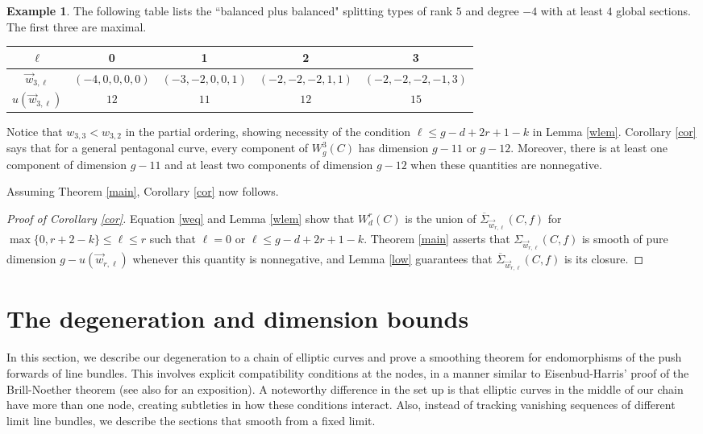 \documentclass[12pt]{amsart}
\newcommand{\Sigmabar}{\overline{\Sigma}}
\theoremstyle{definition}
\newtheorem{Example}[theorem]{Example}
\theoremstyle{remark}
\theoremstyle{remark}
\numberwithin{equation}{section}
\begin{document}
\begin{Example}
The following table lists the ``balanced plus balanced" splitting types of rank $5$ and degree $-4$ with at least $4$ global sections. The first three are maximal.
\begin{center}
\begingroup
\setlength{\tabcolsep}{8pt} %
\renewcommand{\arraystretch}{1.5}
\begin{tabular}{c||c|c|c|c}
$\ell$ & 0 & 1 & 2 & 3 \\ [2pt]
\hline
\hline
$\vec{w}_{3,\ell}$ & $(-4, 0, 0, 0, 0)$ & $(-3, -2, 0, 0, 1)$ & $(-2, -2, -2, 1, 1)$ & $(-2, -2, -2, -1, 3)$ \\ [2pt]
\hline
$u(\vec{w}_{3,\ell})$ & $12$ & $11$ & $12$ & $15$
\end{tabular}
\endgroup
\end{center}
\vspace{.1in}
Notice that $w_{3,3} < w_{3,2}$ in the partial ordering, showing necessity of the condition $\ell \leq g - d + 2r + 1 - k$ in Lemma \ref{wlem}. 
Corollary \ref{cor} says that for a general pentagonal curve, every component of $W^3_g(C)$ has dimension $g - 11$ or $g - 12$. Moreover, there is at least one component of dimension $g - 11$ and at least  two components of dimension $g - 12$ when these quantities are nonnegative.
\end{Example}

Assuming Theorem \ref{main}, Corollary \ref{cor} now follows.

\begin{proof}[Proof of Corollary \ref{cor}]
Equation \eqref{weq} and Lemma \ref{wlem} show that $W^r_d(C)$ is the union of $\Sigmabar_{\vec{w}_{r,\ell}}(C, f)$ for $\max\{0, r+2 - k\} \leq \ell \leq r$
such that $\ell = 0$ or $\ell \leq g - d + 2r + 1 - k$. Theorem \ref{main} asserts that $\Sigma_{\vec{w}_{r,\ell}}(C, f)$ is smooth of pure dimension $g - u(\vec{w}_{r,\ell})$ whenever this quantity is nonnegative, and Lemma \ref{low} guarantees that $\Sigmabar_{\vec{w}_{r,\ell}}(C, f)$ is its closure.
\end{proof}

\section{The degeneration and dimension bounds} \label{dimbounds}
In this section, we describe our degeneration to a chain of elliptic curves and prove a smoothing theorem for endomorphisms of the push forwards of line bundles. This involves explicit compatibility conditions at the nodes, in a manner similar to Eisenbud-Harris' proof of the Brill-Noether theorem \cite{EH} (see also \cite[Ch. 5]{HM} for an exposition). A noteworthy difference in the set up is that elliptic curves in the middle of our chain have more than one node, creating subtleties in how these conditions interact.
Also, instead of tracking vanishing sequences of different limit line bundles, we describe the sections that smooth from a fixed limit.
\end{document}
